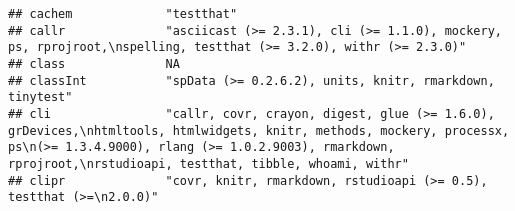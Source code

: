 \documentclass[
]{article}
\begin{document}
\begin{verbatim}
## cachem             "testthat"                                                                                                                                                                                                                                                                                                                                                                                                                                                                        
## callr              "asciicast (>= 2.3.1), cli (>= 1.1.0), mockery, ps, rprojroot,\nspelling, testthat (>= 3.2.0), withr (>= 2.3.0)"                                                                                                                                                                                                                                                                                                                                                                  
## class              NA                                                                                                                                                                                                                                                                                                                                                                                                                                                                                
## classInt           "spData (>= 0.2.6.2), units, knitr, rmarkdown, tinytest"                                                                                                                                                                                                                                                                                                                                                                                                                          
## cli                "callr, covr, crayon, digest, glue (>= 1.6.0), grDevices,\nhtmltools, htmlwidgets, knitr, methods, mockery, processx, ps\n(>= 1.3.4.9000), rlang (>= 1.0.2.9003), rmarkdown, rprojroot,\nrstudioapi, testthat, tibble, whoami, withr"                                                                                                                                                                                                                                             
## clipr              "covr, knitr, rmarkdown, rstudioapi (>= 0.5), testthat (>=\n2.0.0)"                                                                                                                                                                                                                                                                                                                                                                                                               

\end{verbatim}
\end{document}
